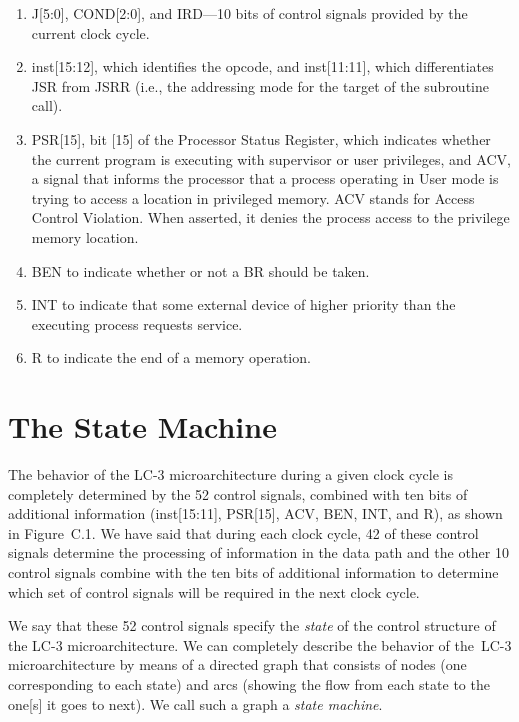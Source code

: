 \documentclass{patt}
\begin{document}
\bgroup
\begin{enumerate}
\item %
  J[5:0], COND[2:0], and IRD---10 bits of control signals provided by
  the current clock cycle.

\item %
  inst[15:12], which identifies the opcode, and inst[11:11], which
  differentiates JSR from JSRR (i.e., the addressing mode for the
  target of the subroutine call).

\item %
  PSR[15], bit [15] of the Processor Status Register, which indicates
  whether the current program is executing with supervisor or user
  privileges, and ACV, a signal that informs the processor that a process 
  operating in User mode is trying to access a location in privileged memory.
  ACV stands for Access Control Violation.  When asserted, it denies the process
  access to the privilege memory location.

\item %
  BEN to indicate whether or not a BR should be taken.

\item %
  INT to indicate that some external device of higher priority than
  the executing process requests service.

\item %
  R to indicate the end of a memory operation.
\end{enumerate}
\egroup

\vspace{-12pt}

\section{The State Machine}

The behavior of the LC-3 microarchitecture during a given clock cycle
is completely determined by the 52 control signals, combined with ten
bits of additional information (inst[15:11], PSR[15], ACV, BEN, INT, and
R), as shown in Figure~C.1.  We have said that during each clock
cycle, 42 of these control signals determine the processing of
information in the data path and the other 10 control signals combine
with the ten bits of additional information to determine which set of
control signals will be required in the next clock cycle.

We say that these 52 control signals specify the {\em state} of
the control structure of the LC-3 microarchitecture.  We can
completely describe the behavior of the~\hbox{LC-3}
microarchitecture by means of a directed graph that consists of
nodes (one corresponding to each state) and arcs (showing the flow
from each state to the one[s] it goes to next).  We call such a
graph a {\em state machine}.
\end{document}
